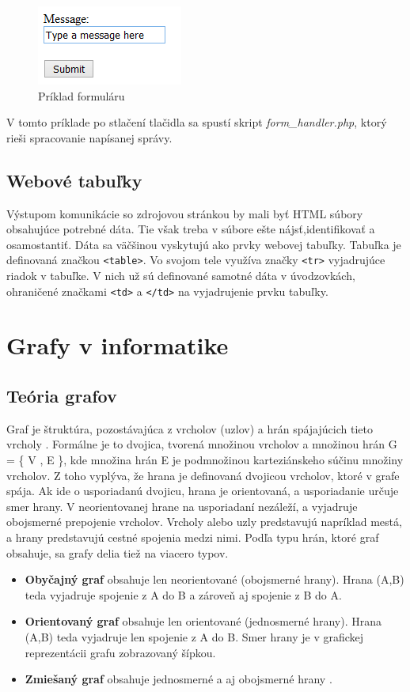 \documentclass[12pt,twoside,slovak,a4paper]{article}
\begin{document}
 \begin{figure}[H]
 	 \caption{Príklad formuláru}
 	 \centering
	 \includegraphics{form_example}
 \end{figure}
	 
V tomto príklade po stlačení tlačidla sa spustí skript \emph{form\_handler.php}, ktorý rieši spracovanie napísanej správy. 


	\subsection{Webové tabuľky}
	Výstupom komunikácie so zdrojovou stránkou by mali byť HTML súbory obsahujúce potrebné dáta. Tie však treba v súbore ešte nájsť,identifikovať a osamostantiť. Dáta sa väčšinou vyskytujú ako prvky webovej tabuľky. Tabuľka je definovaná značkou \texttt{<table>}. Vo svojom tele využíva značky \texttt{<tr>} vyjadrujúce riadok v tabuľke. V nich už sú definované samotné dáta v úvodzovkách, ohraničené značkami \texttt{<td>} a \texttt{</td>} na vyjadrujenie prvku tabuľky.  

\section{Grafy v informatike}

\subsection{Teória grafov}
Graf je štruktúra, pozostávajúca z vrcholov (uzlov) a hrán spájajúcich tieto vrcholy \cite{ADM}. Formálne je to dvojica, tvorená množinou vrcholov a množinou hrán G = \{ V , E \}, kde množina hrán E je podmnožinou karteziánskeho súčinu množiny vrcholov. Z toho vyplýva, že hrana je definovaná dvojicou vrcholov, ktoré v grafe spája.
Ak ide o usporiadanú dvojicu, hrana je orientovaná, a usporiadanie určuje smer hrany. V neorientovanej hrane na usporiadaní nezáleží, a vyjadruje obojsmerné prepojenie vrcholov. Vrcholy alebo uzly predstavujú napríklad mestá, a hrany predstavujú cestné spojenia medzi nimi.  Podľa typu hrán, ktoré graf obsahuje, sa grafy delia tiež na viacero typov.

\begin{itemize}
\item \textbf{Obyčajný graf} obsahuje len neorientované (obojsmerné hrany). Hrana (A,B) teda vyjadruje spojenie z A do B a zároveň aj spojenie z B do A.
\item \textbf{Orientovaný graf} obsahuje len orientované (jednosmerné hrany). Hrana (A,B) teda vyjadruje len spojenie z A do B. Smer hrany je v grafickej reprezentácii grafu zobrazovaný šípkou. 
\item \textbf{Zmiešaný graf} obsahuje jednosmerné a aj obojsmerné hrany \cite{ADM}. 
\end{itemize}	
\end{document}
